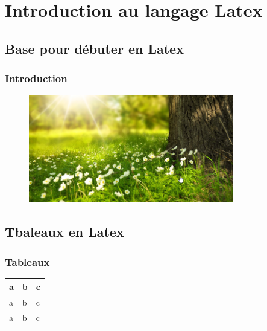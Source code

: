 \documentclass{report}
\begin{document}
\tableofcontents
\part{Introduction au langage Latex}
\chapter{Base pour débuter en Latex}
\section{Introduction}
\lipsum[1-2]
\begin{figure}
    \centering
    \includegraphics[width=0.8\textwidth]{nature.png}
\end{figure}
\chapter{Tbaleaux en Latex}
\section{Tableaux}
\lipsum[1-2]
\begin{table}
    \centering
    \begin{tabular}{|l|l|l|}
        \hline
        a & b & c \\
        \hline
        a & b & c \\
        \hline
        a & b & c \\
        \hline
    \end{tabular}

\end{table}
\end{document}
